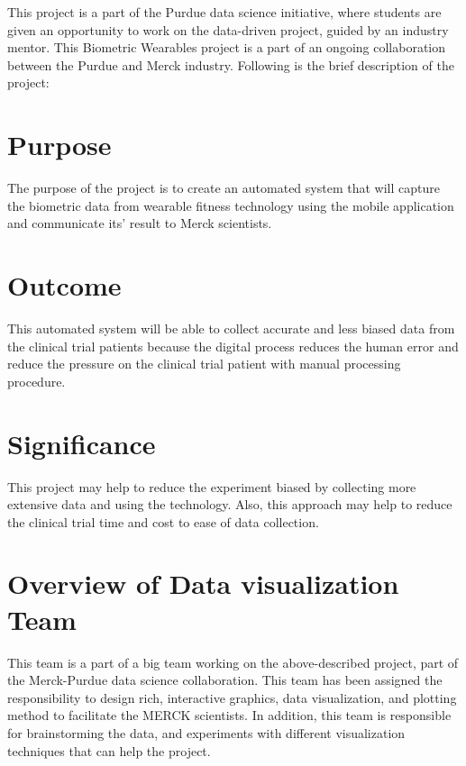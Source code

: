 \documentclass[]{book}
\begin{document}
This project is a part of the Purdue data science initiative, where
students are given an opportunity to work on the data-driven project,
guided by an industry mentor. This Biometric Wearables project is a part
of an ongoing collaboration between the Purdue and Merck industry.
Following is the brief description of the project:

\section{Purpose}\label{purpose}

The purpose of the project is to create an automated system that will
capture the biometric data from wearable fitness technology using the
mobile application and communicate its' result to Merck scientists.

\section{Outcome}\label{outcome}

This automated system will be able to collect accurate and less biased
data from the clinical trial patients because the digital process
reduces the human error and reduce the pressure on the clinical trial
patient with manual processing procedure.

\section{Significance}\label{significance}

This project may help to reduce the experiment biased by collecting more
extensive data and using the technology. Also, this approach may help to
reduce the clinical trial time and cost to ease of data collection.

\section{Overview of Data visualization
Team}\label{overview-of-data-visualization-team}

This team is a part of a big team working on the above-described
project, part of the Merck-Purdue data science collaboration. This team
has been assigned the responsibility to design rich, interactive
graphics, data visualization, and plotting method to facilitate the
MERCK scientists. In addition, this team is responsible for
brainstorming the data, and experiments with different visualization
techniques that can help the project.
\end{document}
